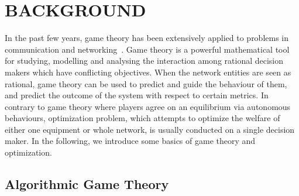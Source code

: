 \chapter{BACKGROUND}


In the past few years, game theory has been extensively applied to problems in communication and networking~\cite{Neel06analysisand, Wang_gtc_crn_survey_2010}.
Game theory is a powerful mathematical tool for studying, modelling and analysing the interaction among rational decision makers which have conflicting objectives.
When the network entities are seen as rational, game theory can be used to predict and guide the behaviour of them, and predict the outcome of the system with respect to certain metrics.
In contrary to game theory where players agree on an equilibrium via autonomous behaviours, optimization problem, which attempts to optimize the welfare of either one equipment or whole network, is usually conducted on a single decision maker.
In the following, we introduce some basics of game theory and optimization.





\section{Algorithmic Game Theory}


